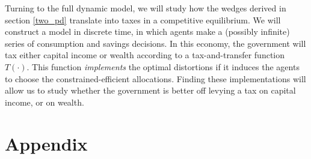 \documentclass[11pt]{article}
\begin{document}
Turning to the full dynamic model, we will study how the wedges derived in section \ref{two_pd} translate into taxes in a competitive equilibrium. We will construct a model in discrete time, in which agents make a (possibly infinite) series of consumption and savings decisions. In this economy, the government will tax either capital income or wealth according to a tax-and-transfer function \( T(\cdot) \). This function \textit{implements} the optimal distortions if it induces the agents to choose the constrained-efficient allocations. Finding these implementations will allow us to study whether the government is better off levying a tax on capital income, or on wealth. 



\newpage
\section*{Appendix}
\renewcommand{\theequation}{A.\arabic{equation}}
\end{document}
